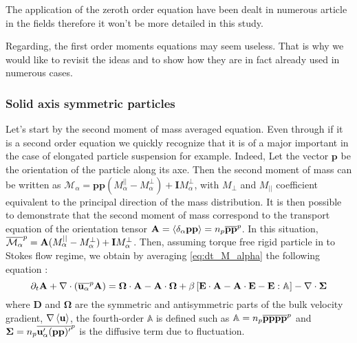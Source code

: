 

The application of the zeroth order equation have been dealt in numerous article in the fields therefore it won't be more detailed in this study. 

Regarding, the first order moments equations may seem useless. 
That is why we would like to revisit the ideas and to show how they are in fact already  used in numerous cases. 

\subsubsection*{Solid axis symmetric particles}

Let's start by the second moment of mass averaged equation. 
Even through if it is a second order equation we quickly recognize that it is of a major important in the case of elongated particle suspension for example. 
Indeed, Let the vector $\textbf{p}$ be the orientation of the particle along its axe.
Then the second moment of mass can be written as $\mathcal{M}_\alpha =  \textbf{pp} (M_\alpha^{||} - M_\alpha^\bot) +  \textbf{I} M_\alpha^\bot$, with $M_{\bot}$ and $M_{||}$ coefficient equivalent to the principal direction of the mass distribution.
It is then possible to demonstrate that the second moment of mass correspond to the transport equation of the orientation tensor $\textbf{A}=\left<\delta_\alpha\textbf{pp}\right> = n_p\overline{\textbf{pp}}^{p}$. 
In this situation, $\overline{\mathcal{M}_\alpha}^{p} =  \textbf{A} (M_\alpha^{||} - M_\alpha^\bot) +  \textbf{I} M_\alpha^\bot$. 
Then, assuming torque free rigid particle in to Stokes flow regime, we obtain by averaging  \ref{eq:dt_M_alpha} the following equation :
\begin{equation}
    \partial_t \textbf{A}
    + \mathbf{\nabla} \cdot (
        \overline{\textbf{u}_\alpha}^{p}\textbf{A}
    )
    = 
    \mathbf{\Omega} \cdot \textbf{A}
    - \textbf{A} \cdot \mathbf{\Omega} 
    + \beta\left[
        \textbf{E} \cdot \textbf{A}
        -\textbf{A} \cdot \textbf{E} 
        - \textbf{E} : \mathbb{A}
    \right]
    - \mathbf{\nabla} \cdot \mathbf{\Sigma}
    \label{eq:hybrid_avg_dt_pp}
\end{equation}
where $\textbf{D}$ and $\mathbf{\Omega}$ are the symmetric and antisymmetric parts of the bulk velocity gradient, $\mathbf{\nabla}\left<\textbf{u}\right>$, the fourth-order $\mathbb{A}$ is defined such as $\mathbb{A} = n_p\overline{\textbf{pppp}}^{p}$ and $\mathbf{\Sigma} = n_p\overline{\textbf{u}'_\alpha(\textbf{pp})'}^{p}$ is the diffusive term due to fluctuation. 

